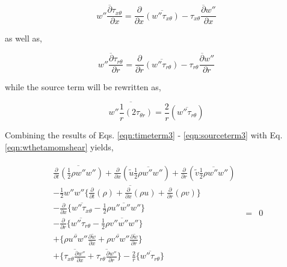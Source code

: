\begin{equation}
	\overline{w''\frac{\partial \tau_{x \theta}}{\partial x}} = \frac{\partial}{\partial x}\overline{(w''\tau_{x\theta})} -
	\overline{\tau_{x\theta}\frac{\partial w''}{\partial x}}
\label{eqn:tauxthetaterm}
\end{equation}
	
	as well as,

\begin{equation}
	\overline{w''\frac{\partial \tau_{r\theta}}{\partial r}} = \frac{\partial}{\partial r}\overline{(w''\tau_{r\theta})} -
	\overline{\tau_{r\theta}\frac{\partial w''}{\partial r}}
\label{eqn:taurthetaterm}
\end{equation}

	while the source term will be rewritten as,

\begin{equation}
	\overline{w''\frac{1}{r}(2\tau_{\theta r})} = \frac{2}{r}(\overline{w'' \tau_{r \theta}})
\label{eqn:sourceterm3}
\end{equation}
	
	Combining the results of Eqs. \ref{eqn:timeterm3} - \ref{eqn:sourceterm3} with Eq. \ref{eqn:wthetamomshear}
yields,

\begin{displaymath}
   \begin{array}{ccc}
      \begin{array}{c}
	\overline{\frac{\partial}{\partial t}(\frac{1}{2}\rho w'' w'')}	+ \frac{\partial}{\partial x}
	(\tilde u \overline{\frac{1}{2}\rho w'' w''}) + \frac{\partial}{\partial r}(\tilde v \overline{\frac{1}{2}\rho w'' w''})\\
	-\overline{\frac{1}{2}w''w''\Big\{\frac{\partial}{\partial t}(\rho) + \frac{\partial}{\partial x}(\rho u)
	+ \frac{\partial}{\partial r}(\rho v)\Big\}} \\ 
	-\frac{\partial}{\partial x}\Big\{ \overline{w''\tau_{x\theta}} - \frac{1}{2}\overline{\rho u'' w'' w''}\Big\} \\
	-\frac{\partial}{\partial r}\Big\{ \overline{w''\tau_{r\theta}} - \frac{1}{2}\overline{\rho v'' w'' w''}\Big\} \\
	+ \Big\{\overline{\rho u'' w''}\frac{\partial \tilde w}{\partial x} +  \overline{\rho v'' w''}
	\frac{\partial \tilde w}{\partial r}  \Big\} \\
	+ \Big\{\overline{\tau_{x\theta}\frac{\partial w''}{\partial x}} 
	+ \overline{\tau_{r\theta}\frac{\partial w''}{\partial r}}  \Big\}
	-\frac{2}{r}\Big\{\overline{w''\tau_{r\theta}} \Big\}
      \end{array}
   & = & 0
   \end{array}	
\end{displaymath}

